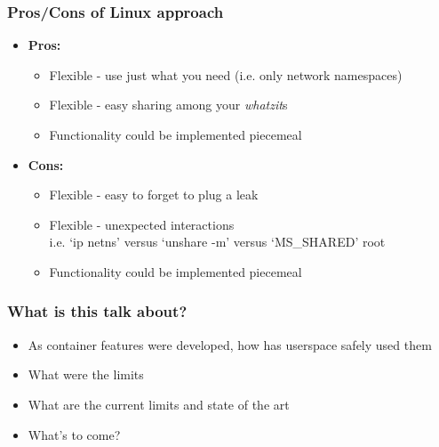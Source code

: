 \documentclass{beamer}
\begin{document}
\begin{frame}
\frametitle{Pros/Cons of Linux approach}
\begin{itemize}
  \item {\bf Pros:}
    \begin{itemize}
      \item Flexible - use just what you need (i.e. only network namespaces)
      \item Flexible - easy sharing among your {\em whatzit}s
      \item Functionality could be implemented piecemeal
    \end{itemize}
\pause
  \item {\bf Cons:}
    \begin{itemize}
      \item Flexible - easy to forget to plug a leak
      \item Flexible - unexpected interactions \\
        i.e. `ip netns' versus `unshare -m' versus `MS\_SHARED' root
      \item Functionality could be implemented piecemeal
    \end{itemize}
\end{itemize}

\end{frame}

\begin{frame}
\frametitle{What is this talk about?}
\begin{itemize}
  \item As container features were developed, how has userspace safely used them
  \item What were the limits
  \item What are the current limits and state of the art
  \item What's to come?
\end{itemize}

\end{frame}
\end{document}
